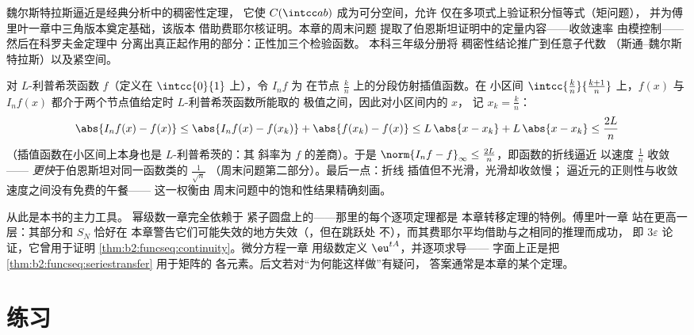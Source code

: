 \begin{remark}[应用]
魏尔斯特拉斯逼近是经典分析中的稠密性定理，
它使 $C(\intcc ab)$ 成为可分空间，允许
仅在多项式上验证积分恒等式（矩问题），
并为傅里叶一章中三角版本奠定基础，该版本
借助费耶尔核证明。本章的周末问题
提取了伯恩斯坦证明中的定量内容——收敛速率
由模控制——然后在科罗夫金定理中
分离出真正起作用的部分：正性加三个检验函数。
本科三年级分册将
稠密性结论推广到任意子代数
（斯通–魏尔斯特拉斯）以及紧空间。
\end{remark}

\begin{example}[带收敛速率的折线逼近]\label{ex:b2:funcseq:polygonal}
对 $L$-利普希茨函数 $f$（定义在 $\intcc{0}{1}$ 上），令 $I_nf$ 为
在节点 $\frac kn$ 上的分段仿射插值函数。在
小区间 $\intcc{\frac kn}{\frac{k+1}n}$ 上，$f(x)$ 与
$I_nf(x)$ 都介于两个节点值给定时 $L$-利普希茨函数所能取的
极值之间，因此对小区间内的 $x$，
记 $x_k = \frac kn$：
\[
\abs{I_nf(x) - f(x)}
\leq \abs{I_nf(x) - f(x_k)} + \abs{f(x_k) - f(x)}
\leq L\,\abs{x - x_k} + L\,\abs{x - x_k}
\leq \frac{2L}{n}
\]
（插值函数在小区间上本身也是 $L$-利普希茨的：其
斜率为 $f$ 的差商）。于是 $\norm{I_nf -
f}_\infty \leq \frac{2L}{n}$，即函数的折线逼近
以速度 $\frac1n$ 收敛——
\emph{更快}于伯恩斯坦对同一函数类的 $\frac{1}{\sqrt n}$
（周末问题第二部分）。最后一点：折线
插值但不光滑，光滑却收敛慢；
逼近元的正则性与收敛速度之间没有免费的午餐——
这一权衡由
周末问题中的饱和性结果精确刻画。
\end{example}

\begin{remark}[本册中的展望]
从此是本书的主力工具。
幂级数一章完全依赖于
紧子圆盘上的——那里的每个逐项定理都是
本章转移定理的特例。傅里叶一章
站在更高一层：其部分和 $S_N$ 恰好在
本章警告它们可能失效的地方失效（，但在跳跃处
不），而其费耶尔平均借助与之相同的推理而成功，
即 $3\varepsilon$ 论证，它曾用于证明
\cref{thm:b2:funcseq:continuity}。微分方程一章
用级数定义 $\eu^{tA}$，并逐项求导——
字面上正是把
\cref{thm:b2:funcseq:seriestransfer} 用于矩阵的
各元素。后文若对“为何能这样做”有疑问，
答案通常是本章的某个定理。
\end{remark}

\section{练习}

